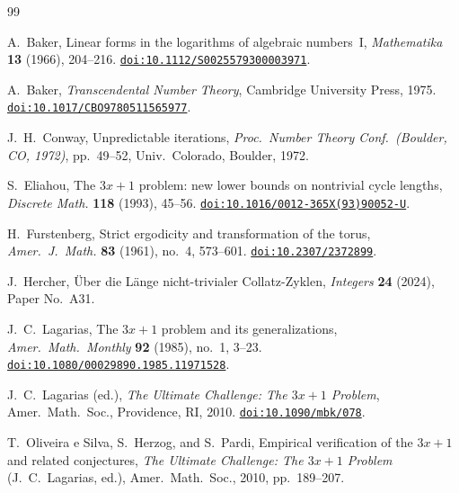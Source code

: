 \documentclass[manuscript]{aomart}
\theoremstyle{plain}
\theoremstyle{definition}
\theoremstyle{remark}
\numberwithin{equation}{section}
\begin{document}


\begin{thebibliography}{99}

A.~Baker,
Linear forms in the logarithms of algebraic numbers~I,
\emph{Mathematika}
\textbf{13} (1966), 204--216.
\newblock \href{https://doi.org/10.1112/S0025579300003971}%
  {\texttt{doi:10.1112/S0025579300003971}}.

A.~Baker,
\emph{Transcendental Number Theory},
Cambridge University Press, 1975.
\newblock \href{https://doi.org/10.1017/CBO9780511565977}%
  {\texttt{doi:10.1017/CBO9780511565977}}.

J.~H.~Conway,
Unpredictable iterations,
\emph{Proc.\ Number Theory Conf.\ (Boulder, CO, 1972)},
pp.~49--52, Univ.\ Colorado, Boulder, 1972.

S.~Eliahou,
The $3x+1$ problem: new lower bounds on nontrivial cycle lengths,
\emph{Discrete Math.}
\textbf{118} (1993), 45--56.
\newblock \href{https://doi.org/10.1016/0012-365X(93)90052-U}%
  {\texttt{doi:10.1016/0012-365X(93)90052-U}}.

H.~Furstenberg,
Strict ergodicity and transformation of the torus,
\emph{Amer.\ J.\ Math.}
\textbf{83} (1961), no.~4, 573--601.
\newblock \href{https://doi.org/10.2307/2372899}%
  {\texttt{doi:10.2307/2372899}}.

J.~Hercher,
Über die Länge nicht-trivialer Collatz-Zyklen,
\emph{Integers}
\textbf{24} (2024), Paper No.~A31.

J.~C.~Lagarias,
The $3x+1$ problem and its generalizations,
\emph{Amer.\ Math.\ Monthly}
\textbf{92} (1985), no.~1, 3--23.
\newblock \href{https://doi.org/10.1080/00029890.1985.11971528}%
  {\texttt{doi:10.1080/00029890.1985.11971528}}.

J.~C.~Lagarias (ed.),
\emph{The Ultimate Challenge: The $3x+1$ Problem},
Amer.\ Math.\ Soc., Providence, RI, 2010.
\newblock \href{https://doi.org/10.1090/mbk/078}%
  {\texttt{doi:10.1090/mbk/078}}.

T.~Oliveira e Silva, S.~Herzog, and S.~Pardi,
Empirical verification of the $3x+1$ and related conjectures,
\emph{The Ultimate Challenge: The $3x+1$ Problem} (J.~C.~Lagarias, ed.),
Amer.\ Math.\ Soc., 2010, pp.~189--207.


\end{thebibliography}
\end{document}

